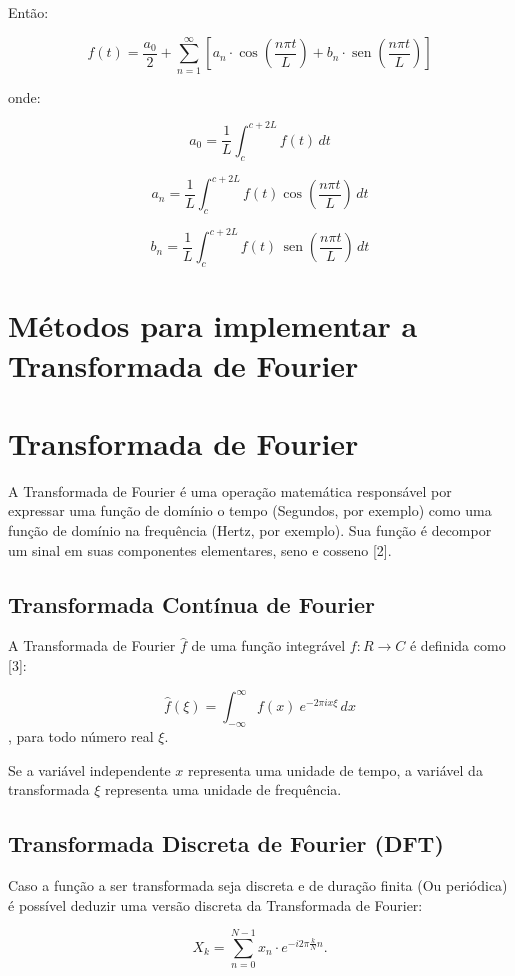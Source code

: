 \documentclass[brazil,times]{abnt}
\begin{document}
	Então:

	$$f(t) = \frac{a_0}{2} + \sum_{n=1}^{\infty}\left[a_n\cdot\cos\left(\frac{n \pi t}{L}\right) + b_n \cdot \operatorname{sen}\left(\frac{n \pi t}{L}\right)\right]$$

	onde:

	$$a_0=\frac{1}{L} \int_{c}^{c+2L} f(t)\,dt$$

	$$a_n=\frac{1}{L} \int_{c}^{c+2L} f(t) \cos\left(\frac{n \pi t}{L}\right)\,dt$$

	$$b_n=\frac{1}{L} \int_{c}^{c+2L} f(t) \,\operatorname{sen}\left(\frac{n \pi t}{L}\right)\,dt$$



\section*{Métodos para implementar a Transformada de Fourier}



\section*{Transformada de Fourier}
	A Transformada de Fourier é uma operação matemática responsável por expressar uma função de domínio o tempo (Segundos, por exemplo) como uma função de domínio na frequência (Hertz, por exemplo). Sua função é decompor um sinal em suas componentes elementares, seno e cosseno [2].

	\subsection*{Transformada Contínua de Fourier}
		A Transformada de Fourier $\hat{f}$ de uma função integrável $f: R \rightarrow C$ é definida como [3]:

		$$\hat{f}(\xi) = \int_{-\infty}^{\infty} f(x)\ e^{- 2\pi i x \xi}\,dx$$, para todo número real $\xi$.

		Se a variável independente $x$ representa uma unidade de tempo, a variável da transformada $\xi$ representa uma unidade de frequência. 

	\subsection*{Transformada Discreta de Fourier (DFT)}
		Caso a função a ser transformada seja discreta e de duração finita (Ou periódica) é possível deduzir uma versão discreta da Transformada de Fourier:

		$$X_k = \sum_{n=0}^{N-1} x_n \cdot e^{-i 2 \pi \frac{k}{N} n}.$$
\end{document}
